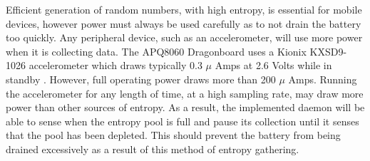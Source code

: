 
Efficient generation of random numbers, with high entropy, is essential for
mobile devices, however power must always be used carefully as to not drain the
battery too quickly. Any peripheral device, such as an accelerometer, will use
more power when it is collecting data. The APQ8060 Dragonboard uses a Kionix
KXSD9-1026 accelerometer which draws typically 0.3 $\mu$ Amps at 2.6 Volts while
in standby \cite{Kionix}. However, full operating power draws more than 200
$\mu$ Amps. Running the accelerometer for any length of time, at a high sampling
rate, may draw more power than other sources of entropy. As a result, the
implemented daemon will be able to sense when the entropy pool is full and pause
its collection until it senses that the pool has been depleted. This should
prevent the battery from being drained excessively as a result of this method of
entropy gathering.
